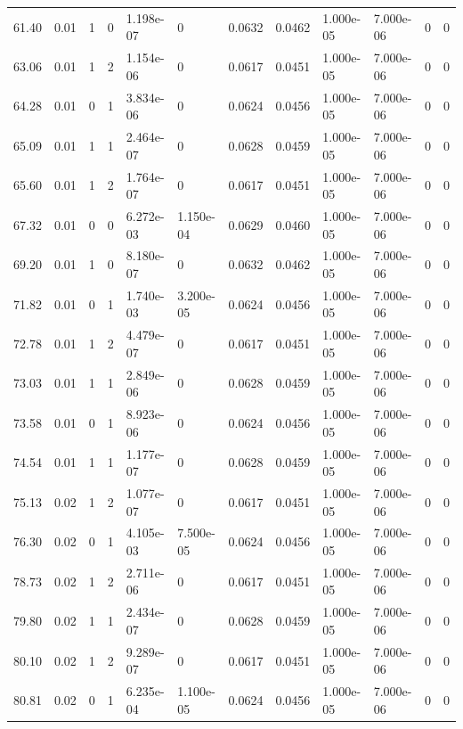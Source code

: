 \documentclass[preview]{standalone}
\begin{document}
{{{\begin{tabular}{L{1.2cm}C{1.2cm} C{0.3cm}C{0.5cm} C{1.4cm}C{1.4cm} C{1.4cm}C{1.4cm} C{1.6cm}C{1.6cm} C{1.6cm}C{1.6cm}}
  61.40  &  0.01  & 1     &  0 &  1.198e-07  & 0  &  0.0632&   0.0462& 1.000e-05 & 7.000e-06   &  0 & 0  \\ 
  63.06  &  0.01  & 1     &  2 &  1.154e-06  & 0  &  0.0617&   0.0451& 1.000e-05 & 7.000e-06   &  0 & 0  \\ 
  64.28  &  0.01  & 0     &  1 &  3.834e-06  & 0  &  0.0624&   0.0456& 1.000e-05 & 7.000e-06   &  0 & 0  \\ 
  65.09  &  0.01  & 1     &  1 &  2.464e-07  & 0  &  0.0628&   0.0459& 1.000e-05 & 7.000e-06   &  0 & 0  \\ 
  65.60  &  0.01  & 1     &  2 &  1.764e-07  & 0  &  0.0617&   0.0451& 1.000e-05 & 7.000e-06   &  0 & 0  \\ 
  67.32  &  0.01  & 0     &  0 &  6.272e-03  & 1.150e-04  &  0.0629&   0.0460& 1.000e-05 & 7.000e-06   &  0 & 0  \\ 
  69.20  &  0.01  & 1     &  0 &  8.180e-07  & 0  &  0.0632&   0.0462& 1.000e-05 & 7.000e-06   &  0 & 0  \\ 
  71.82  &  0.01  & 0     &  1 &  1.740e-03  & 3.200e-05  &  0.0624&   0.0456& 1.000e-05 & 7.000e-06   &  0 & 0  \\ 
  72.78  &  0.01  & 1     &  2 &  4.479e-07  & 0  &  0.0617&   0.0451& 1.000e-05 & 7.000e-06   &  0 & 0  \\ 
  73.03  &  0.01  & 1     &  1 &  2.849e-06  & 0  &  0.0628&   0.0459& 1.000e-05 & 7.000e-06   &  0 & 0  \\ 
  73.58  &  0.01  & 0     &  1 &  8.923e-06  & 0  &  0.0624&   0.0456& 1.000e-05 & 7.000e-06   &  0 & 0  \\ 
  74.54  &  0.01  & 1     &  1 &  1.177e-07  & 0  &  0.0628&   0.0459& 1.000e-05 & 7.000e-06   &  0 & 0  \\ 
  75.13  &  0.02  & 1     &  2 &  1.077e-07  & 0  &  0.0617&   0.0451& 1.000e-05 & 7.000e-06   &  0 & 0  \\ 
  76.30  &  0.02  & 0     &  1 &  4.105e-03  & 7.500e-05  &  0.0624&   0.0456& 1.000e-05 & 7.000e-06   &  0 & 0  \\ 
  78.73  &  0.02  & 1     &  2 &  2.711e-06  & 0  &  0.0617&   0.0451& 1.000e-05 & 7.000e-06   &  0 & 0  \\ 
  79.80  &  0.02  & 1     &  1 &  2.434e-07  & 0  &  0.0628&   0.0459& 1.000e-05 & 7.000e-06   &  0 & 0  \\ 
  80.10  &  0.02  & 1     &  2 &  9.289e-07  & 0  &  0.0617&   0.0451& 1.000e-05 & 7.000e-06   &  0 & 0  \\ 
  80.81  &  0.02  & 0     &  1 &  6.235e-04  & 1.100e-05  &  0.0624&   0.0456& 1.000e-05 & 7.000e-06   &  0 & 0  \\ 

\end{tabular}}}}
\end{document}
